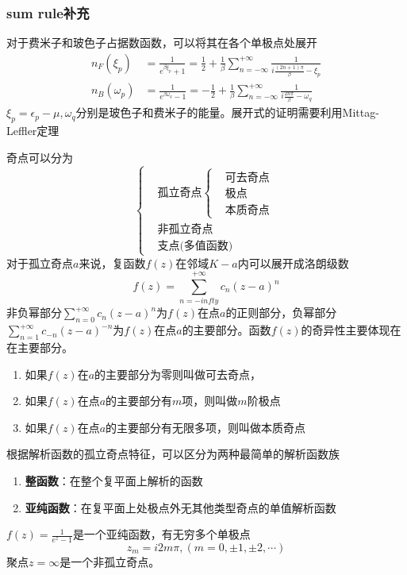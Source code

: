 \documentclass{article}
\numberwithin{equation}{subsection}
\begin{document}
\subsubsection*{sum rule补充}
对于费米子和玻色子占据数函数，可以将其在各个单极点处展开
\begin{equation}
    \begin{split}
        n_F(\xi_p)&=\frac{1}{e^{\beta\xi_p}+1}=\frac{1}{2}+\frac{1}{\beta}\sum_{n=-\infty}^{+\infty}\frac{1}{i\frac{(2n+1)\pi}{\beta}-\xi_p}\\
        n_B(\omega_p)&=\frac{1}{e^{\beta\omega_q}-1}=-\frac{1}{2}+\frac{1}{\beta}\sum_{n=-\infty}^{+\infty}\frac{1}{i\frac{2n\pi}{\beta}-\omega_q}
    \end{split}
\end{equation}
$\xi_p=\epsilon_p-\mu, \omega_q$分别是玻色子和费米子的能量。展开式的证明需要利用Mittag-Leffler定理

奇点可以分为
\begin{equation}
    \begin{cases}
        &\text{孤立奇点}\begin{cases}
            &\text{可去奇点}\\
            &\text{极点}\\
            &\text{本质奇点}
        \end{cases}\\
        &\text{非孤立奇点}\\
        &\text{支点(多值函数)}
    \end{cases}
\end{equation}
对于孤立奇点$a$来说，复函数$f(z)$在邻域$K-{a}$内可以展开成洛朗级数
\begin{equation}
    f(z)=\sum_{n=-infty}^{+\infty}c_n(z-a)^n
\end{equation}
非负幂部分$\sum_{n=0}^{+\infty}c_n(z-a)^n$为$f(z)$在点$a$的正则部分，负幂部分$\sum_{n=1}^{+\infty}c_{-n}(z-a)^{-n}$为$f(z)$在点$a$的主要部分。函数$f(z)$的奇异性主要体现在在主要部分。
\begin{enumerate}
    \item 如果$f(z)$在$a$的主要部分为零则叫做可去奇点，
    \item 如果$f(z)$在点$a$的主要部分有$m$项，则叫做$m$阶极点
    \item 如果$f(z)$在点$a$的主要部分有无限多项，则叫做本质奇点
\end{enumerate}
根据解析函数的孤立奇点特征，可以区分为两种最简单的解析函数族
\begin{enumerate}
    \item \textbf{整函数}：在整个复平面上解析的函数
    \item \textbf{亚纯函数}：在复平面上处极点外无其他类型奇点的单值解析函数
\end{enumerate}
$f(z)=\frac{1}{e^z-1}$是一个亚纯函数，有无穷多个单极点
\begin{equation}
    z_m=i2m\pi,(m=0,\pm1,\pm2,\cdots)
\end{equation}
聚点$z=\infty$是一个非孤立奇点。
\end{document}
